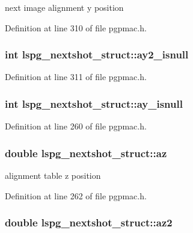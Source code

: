 next image alignment y position 



Definition at line 310 of file pgpmac.\-h.

\hypertarget{structlspg__nextshot__struct_ad0f50ec6339296d3d39c8d95131ab6b5}{
\subsubsection[{ay2\-\_\-isnull}]{\setlength{\rightskip}{0pt plus 5cm}int lspg\-\_\-nextshot\-\_\-struct\-::ay2\-\_\-isnull}}\label{structlspg__nextshot__struct_ad0f50ec6339296d3d39c8d95131ab6b5}


Definition at line 311 of file pgpmac.\-h.

\hypertarget{structlspg__nextshot__struct_a9da91abc8090532ed98ccd47a3bab775}{
\subsubsection[{ay\-\_\-isnull}]{\setlength{\rightskip}{0pt plus 5cm}int lspg\-\_\-nextshot\-\_\-struct\-::ay\-\_\-isnull}}\label{structlspg__nextshot__struct_a9da91abc8090532ed98ccd47a3bab775}


Definition at line 260 of file pgpmac.\-h.

\hypertarget{structlspg__nextshot__struct_a66e678866ce79f6398b66d033ae45a17}{
\subsubsection[{az}]{\setlength{\rightskip}{0pt plus 5cm}double lspg\-\_\-nextshot\-\_\-struct\-::az}}\label{structlspg__nextshot__struct_a66e678866ce79f6398b66d033ae45a17}


alignment table z position 



Definition at line 262 of file pgpmac.\-h.

\hypertarget{structlspg__nextshot__struct_a94698a030fd5b2abf1f10a2ad33476a4}{
\subsubsection[{az2}]{\setlength{\rightskip}{0pt plus 5cm}double lspg\-\_\-nextshot\-\_\-struct\-::az2}}\label{structlspg__nextshot__struct_a94698a030fd5b2abf1f10a2ad33476a4}


